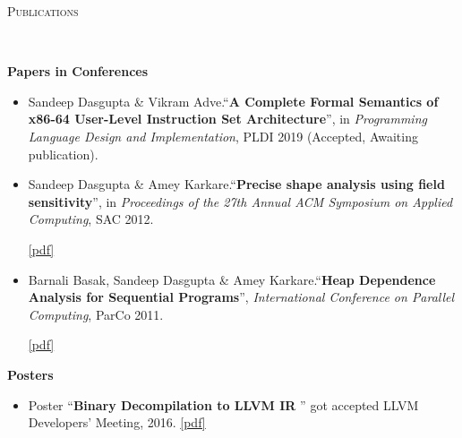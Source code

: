 \documentclass[9pt]{article}
\newenvironment{changemargin}[2]{%
  \begin{list}{}{%
    \setlength{\topsep}{0pt}%
    \setlength{\leftmargin}{#1}%
    \setlength{\rightmargin}{#2}%
    \setlength{\listparindent}{\parindent}%
    \setlength{\itemindent}{\parindent}%
    \setlength{\parsep}{\parskip}%
  }%
  \item[]}{\end{list}
}
\newcommand{\lineover}{
	\begin{changemargin}{-0.05in}{-0.05in}
		\vspace*{-8pt}
		\hrulefill \\
		\vspace*{-2pt}
	\end{changemargin}
}
\newcommand{\header}[1]{
	\begin{changemargin}{-0.5in}{-0.5in}
		\scshape{#1}\\
  	\lineover
	\end{changemargin}
}
\newcommand{\cmnt}[1]{}
\newenvironment{body} {
	\vspace*{-16pt}
	\begin{changemargin}{-0.25in}{-0.5in}
  }	
	{\end{changemargin}
}
\begin{document}
\smallskip

\header{Publications}
\begin{body}
\vspace{14pt}
\textbf{Papers in Conferences}\\
	\vspace*{-4pt}
	\begin{itemize} \itemsep -0pt
		\item Sandeep Dasgupta \& Vikram Adve.``\textbf{A Complete Formal Semantics of x86-64 User-Level
Instruction Set Architecture}'', in \emph{Programming Language Design and Implementation}, PLDI 2019 (Accepted, Awaiting publication). 
		\item Sandeep Dasgupta \& Amey Karkare.``\textbf{Precise shape analysis using field sensitivity}'', in \emph{Proceedings of the 27th Annual ACM Symposium on Applied Computing}, SAC 2012. 
                \cmnt{ \href{http://dx.doi.org/10.1145/2245276.2231982}{doi: 10.1145/2231936.2231982}. }
                \href{http://webhost.engr.illinois.edu/~sdasgup3/Document/sac_2012.pdf}{[pdf]}\\

		\item Barnali Basak, Sandeep Dasgupta \& Amey Karkare.``\textbf{Heap Dependence Analysis for Sequential Programs}'', \emph{International Conference on Parallel Computing}, ParCo 2011. 
                \cmnt{ \href{http://dx.doi.org/10.3233/978-1-61499-041-3-99}{doi: 10.3233/978-1-61499-041-3-99}.  }
                \href{http://webhost.engr.illinois.edu/~sdasgup3/Document/parco_2011.pdf}{[pdf]} \\
                  \cmnt{
		\begin{itemize} \itemsep -0pt
			\item Published in: Applications, Tools and Techniques on the Road to Exascale Computing, 22 volume of Advances in 
				Parallel Computing, chapter: Heap Dependence Analysis for Sequential Programs, pages 99--106. IOS Press, May 2012. 
				doi: \href{http://dx.doi.org/10.3233/978-1-61499-041-3-99}{10.3233/978-1-61499-041-3-99}, isbn: 978-1-61499-040-6.
		\end{itemize}
                  }
	\end{itemize}

\textbf{Posters}\\
	\vspace*{-4pt}
	\begin{itemize} \itemsep -0pt
                \item Poster ``\textbf{Binary Decompilation to LLVM IR
                  }'' got accepted LLVM Developers' Meeting, 2016.
                  \href{https://www.dropbox.com/s/8s20r8pi3eu4knw/allin_poster.pdf?dl=0}{[pdf]}


\end{itemize}
\end{body}
\end{document}
